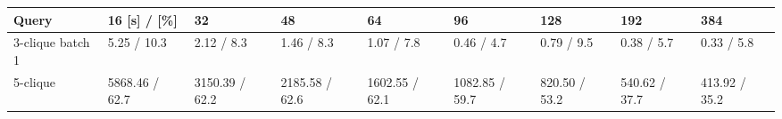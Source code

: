 \begin{tabular}{lllllllll}
\toprule
            Query &    16 [s] / [\%] &              32 &              48 &              64 &              96 &            128 &            192 &            384 \\
\midrule
 3-clique batch 1 &     5.25 / 10.3 &      2.12 / 8.3 &      1.46 / 8.3 &      1.07 / 7.8 &      0.46 / 4.7 &     0.79 / 9.5 &     0.38 / 5.7 &     0.33 / 5.8 \\
         5-clique &  5868.46 / 62.7 &  3150.39 / 62.2 &  2185.58 / 62.6 &  1602.55 / 62.1 &  1082.85 / 59.7 &  820.50 / 53.2 &  540.62 / 37.7 &  413.92 / 35.2 \\
\bottomrule
\end{tabular}
